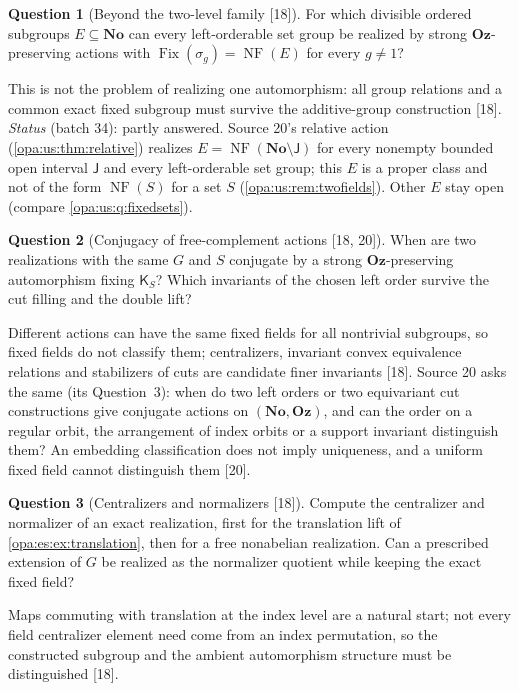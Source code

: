 \documentclass[11pt,oneside]{article}
\numberwithin{equation}{section}
\theoremstyle{definition}
\newtheorem{question}[question]{Question}
\theoremstyle{remark}
\newcommand{\No}{\mathbf{No}}
\newcommand{\Oz}{\mathbf{Oz}}
\newcommand{\Fix}{\operatorname{Fix}}
\newcommand{\src}[1]{\textup{\textsf{\small[#1]}}}
\newcommand{\NF}{\operatorname{NF}}
\begin{document}
\begin{question}[Beyond the two-level family \src{18}]\label{opa:es:q:beyond}
For which divisible ordered subgroups $E\subseteq\No$ can every left-orderable set group be realized by strong $\Oz$-preserving actions with
$\Fix(\sigma_g)=\NF(E)$ for every $g\ne1$?
\end{question}
This is not the problem of realizing one automorphism: all group relations and a common exact fixed subgroup must survive the additive-group
construction \src{18}. \emph{Status} (batch 34): partly answered. Source 20's relative action (\cref{opa:us:thm:relative}) realizes
$E=\NF(\No\setminus\mathsf J)$ for every nonempty bounded open interval $\mathsf J$ and every left-orderable set group; this $E$ is a proper class and
not of the form $\NF(S)$ for a set $S$ (\cref{opa:us:rem:twofields}). Other $E$ stay open (compare \cref{opa:us:q:fixedsets}).

\begin{question}[Conjugacy of free-complement actions \src{18, 20}]\label{opa:es:q:conjugacy}
When are two realizations with the same $G$ and $S$ conjugate by a strong $\Oz$-preserving automorphism fixing $\mathsf K_S$? Which invariants of
the chosen left order survive the cut filling and the double lift?
\end{question}
Different actions can have the same fixed fields for all nontrivial subgroups, so fixed fields do not classify them; centralizers, invariant
convex equivalence relations and stabilizers of cuts are candidate finer invariants \src{18}. Source 20 asks the same (its Question~3):
when do two left orders or two equivariant cut constructions give conjugate actions on $(\No,\Oz)$, and can the order on a regular orbit, the
arrangement of index orbits or a support invariant distinguish them? An embedding classification does not imply uniqueness, and a uniform fixed
field cannot distinguish them \src{20}.

\begin{question}[Centralizers and normalizers \src{18}]\label{opa:es:q:centralizers}
Compute the centralizer and normalizer of an exact realization, first for the translation lift of \cref{opa:es:ex:translation}, then for a free
nonabelian realization. Can a prescribed extension of $G$ be realized as the normalizer quotient while keeping the exact fixed field?
\end{question}
Maps commuting with translation at the index level are a natural start; not every field centralizer element need come from an index
permutation, so the constructed subgroup and the ambient automorphism structure must be distinguished \src{18}.
\end{document}
